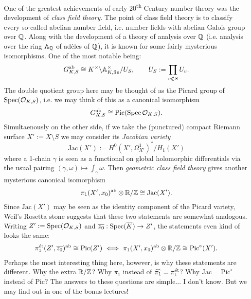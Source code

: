 One of the greatest achievements of early 20\textsuperscript{th} Century number theory was the development of \emph{class field theory}. The point of class field theory is to classify every so-called abelian number field, i.e. number fields with abelian Galois group over $\mathbb{Q}$. Along with the development of a theory of analysis over $\mathbb{Q}$ (i.e. analysis over the ring $\mathbb{A}_{\mathbb{Q}}$ of ad\`eles of $\mathbb{Q}$), it is known for some fairly mysterious isomorphisms. One of the most notable being:
\[
	G_{K, S}^{\mathrm{ab}} \cong K^\times \backslash \mathbb{A}_{K, \mathrm{fin}}^\times / U_S,\qquad U_S:= \prod_{v \notin S} U_v.
\]
The double quotient group here may be thought of as the Picard group of $\mathrm{Spec}(\mathcal{O}_{K,S})$, i.e. we may think of this as a canonical isomorphism 
\[
	G_{K,S}^{\mathrm{ab}} \cong \mathrm{Pic}(\mathrm{Spec}\,\mathcal{O}_{K,S}).
\]
Simultaenously on the other side, if we take the (punctured) compact Riemann surface $X' := X\setminus S$ we may consider its \emph{Jacobian variety}
\[
	\mathrm{Jac}(X') := H^0(X', \Omega_{X'}^1)^* / H_1(X')
\]
where a 1-chain $\gamma$ is seen as a functional on global holomorphic differentials via the usual pairing $(\gamma, \omega) \mapsto \int_\gamma \omega$. Then \emph{geometric class field theory} gives another mysterious canonical isomorphism 
\[
	\pi_1(X', x_0)^{\mathrm{ab}} \otimes \mathbb{R}/\mathbb{Z} \cong \mathrm{Jac}(X').
\]
Since $\mathrm{Jac}(X')$ may be seen as the identity component of the Picard variety, Weil's Rosetta stone suggests that these two statements are somewhat analogous. Writing $Z' := \mathrm{Spec}(\mathcal{O}_{K,S})$ and $\overline{z_0} : \mathrm{Spec}(\overline{K}) \to Z'$, the statements even kind of looks the same:
\[
	\pi_1^{\mathrm{\acute{e}t}}(Z', \overline{z_0})^{\mathrm{ab}} \cong \mathrm{Pic}(Z') \,\,\Longleftrightarrow\,\, \pi_1(X', x_0)^{\mathrm{ab}} \otimes \mathbb{R}/\mathbb{Z} \cong \mathrm{Pic}^\circ (X').
\]
Perhaps the most interesting thing here, however, is why these statements are different. Why the extra $\mathbb{R}/\mathbb{Z}$? Why $\pi_1$ instead of $\widehat{\pi_1}=\pi_1^{\mathrm{\acute{e}t}}$? Why $\mathrm{Jac}=\mathrm{Pic}^\circ$ instead of $\mathrm{Pic}$? The answers to these questions are simple... I don't know. But we may find out in one of the bonus lectures!